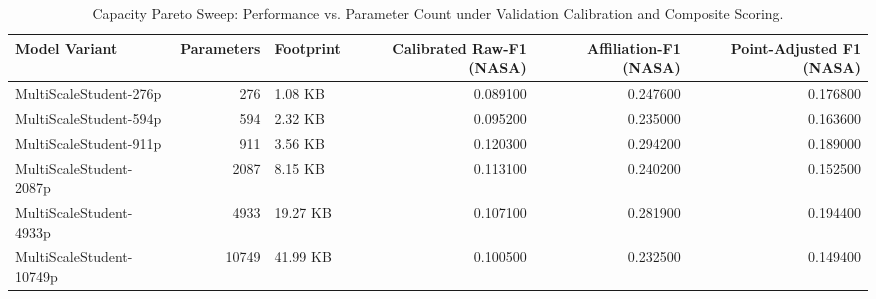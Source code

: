 \begin{table}
\caption{Capacity Pareto Sweep: Performance vs. Parameter Count under Validation Calibration and Composite Scoring.}
\begin{tabular}{lrlrrr}
\toprule
Model Variant & Parameters & Footprint & Calibrated Raw-F1 (NASA) & Affiliation-F1 (NASA) & Point-Adjusted F1 (NASA) \\
\midrule
MultiScaleStudent-276p & 276 & 1.08 KB & 0.089100 & 0.247600 & 0.176800 \\
MultiScaleStudent-594p & 594 & 2.32 KB & 0.095200 & 0.235000 & 0.163600 \\
MultiScaleStudent-911p & 911 & 3.56 KB & 0.120300 & 0.294200 & 0.189000 \\
MultiScaleStudent-2087p & 2087 & 8.15 KB & 0.113100 & 0.240200 & 0.152500 \\
MultiScaleStudent-4933p & 4933 & 19.27 KB & 0.107100 & 0.281900 & 0.194400 \\
MultiScaleStudent-10749p & 10749 & 41.99 KB & 0.100500 & 0.232500 & 0.149400 \\
\bottomrule
\end{tabular}
\end{table}
